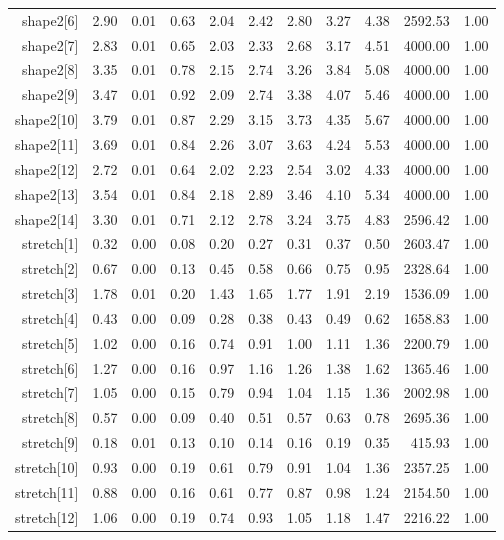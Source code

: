 \begin{longtable}{rrrrrrrrrrr}
  shape2[6] & 2.90 & 0.01 & 0.63 & 2.04 & 2.42 & 2.80 & 3.27 & 4.38 & 2592.53 & 1.00 \\ 
  shape2[7] & 2.83 & 0.01 & 0.65 & 2.03 & 2.33 & 2.68 & 3.17 & 4.51 & 4000.00 & 1.00 \\ 
  shape2[8] & 3.35 & 0.01 & 0.78 & 2.15 & 2.74 & 3.26 & 3.84 & 5.08 & 4000.00 & 1.00 \\ 
  shape2[9] & 3.47 & 0.01 & 0.92 & 2.09 & 2.74 & 3.38 & 4.07 & 5.46 & 4000.00 & 1.00 \\ 
  shape2[10] & 3.79 & 0.01 & 0.87 & 2.29 & 3.15 & 3.73 & 4.35 & 5.67 & 4000.00 & 1.00 \\ 
  shape2[11] & 3.69 & 0.01 & 0.84 & 2.26 & 3.07 & 3.63 & 4.24 & 5.53 & 4000.00 & 1.00 \\ 
  shape2[12] & 2.72 & 0.01 & 0.64 & 2.02 & 2.23 & 2.54 & 3.02 & 4.33 & 4000.00 & 1.00 \\ 
  shape2[13] & 3.54 & 0.01 & 0.84 & 2.18 & 2.89 & 3.46 & 4.10 & 5.34 & 4000.00 & 1.00 \\ 
  shape2[14] & 3.30 & 0.01 & 0.71 & 2.12 & 2.78 & 3.24 & 3.75 & 4.83 & 2596.42 & 1.00 \\ 
  stretch[1] & 0.32 & 0.00 & 0.08 & 0.20 & 0.27 & 0.31 & 0.37 & 0.50 & 2603.47 & 1.00 \\ 
  stretch[2] & 0.67 & 0.00 & 0.13 & 0.45 & 0.58 & 0.66 & 0.75 & 0.95 & 2328.64 & 1.00 \\ 
  stretch[3] & 1.78 & 0.01 & 0.20 & 1.43 & 1.65 & 1.77 & 1.91 & 2.19 & 1536.09 & 1.00 \\ 
  stretch[4] & 0.43 & 0.00 & 0.09 & 0.28 & 0.38 & 0.43 & 0.49 & 0.62 & 1658.83 & 1.00 \\ 
  stretch[5] & 1.02 & 0.00 & 0.16 & 0.74 & 0.91 & 1.00 & 1.11 & 1.36 & 2200.79 & 1.00 \\ 
  stretch[6] & 1.27 & 0.00 & 0.16 & 0.97 & 1.16 & 1.26 & 1.38 & 1.62 & 1365.46 & 1.00 \\ 
  stretch[7] & 1.05 & 0.00 & 0.15 & 0.79 & 0.94 & 1.04 & 1.15 & 1.36 & 2002.98 & 1.00 \\ 
  stretch[8] & 0.57 & 0.00 & 0.09 & 0.40 & 0.51 & 0.57 & 0.63 & 0.78 & 2695.36 & 1.00 \\ 
  stretch[9] & 0.18 & 0.01 & 0.13 & 0.10 & 0.14 & 0.16 & 0.19 & 0.35 & 415.93 & 1.00 \\ 
  stretch[10] & 0.93 & 0.00 & 0.19 & 0.61 & 0.79 & 0.91 & 1.04 & 1.36 & 2357.25 & 1.00 \\ 
  stretch[11] & 0.88 & 0.00 & 0.16 & 0.61 & 0.77 & 0.87 & 0.98 & 1.24 & 2154.50 & 1.00 \\ 
  stretch[12] & 1.06 & 0.00 & 0.19 & 0.74 & 0.93 & 1.05 & 1.18 & 1.47 & 2216.22 & 1.00 \\ 

\end{longtable}
